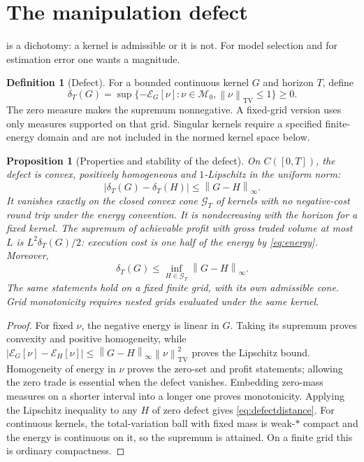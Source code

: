 \documentclass[11pt]{article}
\newcommand{\norm}[1]{\left\lVert #1\right\rVert}
\numberwithin{equation}{section}
\newtheorem{proposition}[theorem]{Proposition}
\theoremstyle{definition}
\newtheorem{definition}[theorem]{Definition}
\theoremstyle{remark}
\theoremstyle{definition}
\newcommand{\TV}{\operatorname{TV}}
\begin{document}
\section{The manipulation defect}\label{sec:defect}

 is a dichotomy: a kernel is admissible or it is not. For model
selection and for estimation error one wants a magnitude.

\begin{definition}[Defect]\label{def:defect}
For a bounded continuous kernel $G$ and horizon $T$, define
\begin{equation}\label{eq:defect}
 \delta_T(G)=\sup\{-\mathcal E_G[\nu]:\nu\in\mathcal M_0,
                       \norm\nu_{\TV}\le1\}\ge0.
\end{equation}
The zero measure makes the supremum nonnegative. A fixed-grid version uses
only measures supported on that grid. Singular kernels require a specified
finite-energy domain and are not included in the normed kernel space below.
\end{definition}

\begin{proposition}[Properties and stability of the defect]\label{prop:defect}
On $C([0,T])$, the defect is convex, positively homogeneous and
$1$-Lipschitz in the uniform norm:
\begin{equation}\label{eq:defect-lip}
 |\delta_T(G)-\delta_T(H)|\leq\norm{G-H}_\infty.
\end{equation}
It vanishes exactly on the closed convex
cone $\mathcal G_T$ of kernels with no negative-cost round trip under the
energy convention. It is nondecreasing with the horizon for a fixed kernel.
The supremum of achievable profit with gross traded volume at most $L$ is
$L^2\delta_T(G)/2$: execution cost is one half of the energy by
\eqref{eq:energy}. Moreover,
\begin{equation}\label{eq:defectdistance}
 \delta_T(G)\le\inf_{H\in\mathcal G_T}\norm{G-H}_\infty .
\end{equation}
The same statements hold on a fixed finite grid, with its own admissible cone.
Grid monotonicity requires nested grids evaluated under the same kernel.
\end{proposition}
\begin{proof}
For fixed $\nu$, the negative energy is linear in $G$. Taking its supremum
proves convexity and positive homogeneity, while
$|\mathcal E_G[\nu]-\mathcal E_H[\nu]|
\le\norm{G-H}_\infty\norm\nu_{\TV}^2$ proves the Lipschitz bound.
Homogeneity of energy in $\nu$ proves the zero-set and profit statements;
allowing the zero trade is essential when the defect vanishes. Embedding
zero-mass measures on a shorter interval into a longer one proves monotonicity.
Applying the Lipschitz inequality to any $H$ of zero defect gives
\eqref{eq:defectdistance}. For continuous kernels, the total-variation ball
with fixed mass is weak-$*$ compact and the energy is continuous on it, so
the supremum is attained. On a finite grid this is ordinary compactness.
\end{proof}
\end{document}
